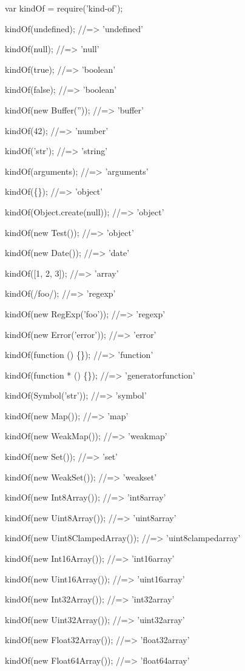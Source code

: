 \begin{DoxyCode}
var kindOf = require('kind-of');

kindOf(undefined);
//=> 'undefined'

kindOf(null);
//=> 'null'

kindOf(true);
//=> 'boolean'

kindOf(false);
//=> 'boolean'

kindOf(new Buffer(''));
//=> 'buffer'

kindOf(42);
//=> 'number'

kindOf('str');
//=> 'string'

kindOf(arguments);
//=> 'arguments'

kindOf(\{\});
//=> 'object'

kindOf(Object.create(null));
//=> 'object'

kindOf(new Test());
//=> 'object'

kindOf(new Date());
//=> 'date'

kindOf([1, 2, 3]);
//=> 'array'

kindOf(/foo/);
//=> 'regexp'

kindOf(new RegExp('foo'));
//=> 'regexp'

kindOf(new Error('error'));
//=> 'error'

kindOf(function () \{\});
//=> 'function'

kindOf(function * () \{\});
//=> 'generatorfunction'

kindOf(Symbol('str'));
//=> 'symbol'

kindOf(new Map());
//=> 'map'

kindOf(new WeakMap());
//=> 'weakmap'

kindOf(new Set());
//=> 'set'

kindOf(new WeakSet());
//=> 'weakset'

kindOf(new Int8Array());
//=> 'int8array'

kindOf(new Uint8Array());
//=> 'uint8array'

kindOf(new Uint8ClampedArray());
//=> 'uint8clampedarray'

kindOf(new Int16Array());
//=> 'int16array'

kindOf(new Uint16Array());
//=> 'uint16array'

kindOf(new Int32Array());
//=> 'int32array'

kindOf(new Uint32Array());
//=> 'uint32array'

kindOf(new Float32Array());
//=> 'float32array'

kindOf(new Float64Array());
//=> 'float64array'
\end{DoxyCode}


